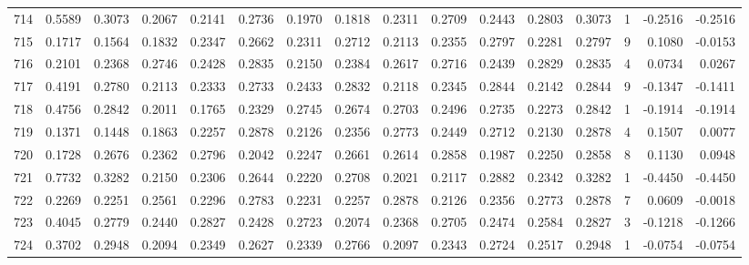 \begin{tabular}{lrrrrrrrrrrrrrrr}
714 &      0.5589 &  0.3073 &  0.2067 &  0.2141 &  0.2736 &  0.1970 &  0.1818 &  0.2311 &  0.2709 &  0.2443 &   0.2803 &     0.3073 &      1 &                   -0.2516 &                    -0.2516 \\
715 &      0.1717 &  0.1564 &  0.1832 &  0.2347 &  0.2662 &  0.2311 &  0.2712 &  0.2113 &  0.2355 &  0.2797 &   0.2281 &     0.2797 &      9 &                    0.1080 &                    -0.0153 \\
716 &      0.2101 &  0.2368 &  0.2746 &  0.2428 &  0.2835 &  0.2150 &  0.2384 &  0.2617 &  0.2716 &  0.2439 &   0.2829 &     0.2835 &      4 &                    0.0734 &                     0.0267 \\
717 &      0.4191 &  0.2780 &  0.2113 &  0.2333 &  0.2733 &  0.2433 &  0.2832 &  0.2118 &  0.2345 &  0.2844 &   0.2142 &     0.2844 &      9 &                   -0.1347 &                    -0.1411 \\
718 &      0.4756 &  0.2842 &  0.2011 &  0.1765 &  0.2329 &  0.2745 &  0.2674 &  0.2703 &  0.2496 &  0.2735 &   0.2273 &     0.2842 &      1 &                   -0.1914 &                    -0.1914 \\
719 &      0.1371 &  0.1448 &  0.1863 &  0.2257 &  0.2878 &  0.2126 &  0.2356 &  0.2773 &  0.2449 &  0.2712 &   0.2130 &     0.2878 &      4 &                    0.1507 &                     0.0077 \\
720 &      0.1728 &  0.2676 &  0.2362 &  0.2796 &  0.2042 &  0.2247 &  0.2661 &  0.2614 &  0.2858 &  0.1987 &   0.2250 &     0.2858 &      8 &                    0.1130 &                     0.0948 \\
721 &      0.7732 &  0.3282 &  0.2150 &  0.2306 &  0.2644 &  0.2220 &  0.2708 &  0.2021 &  0.2117 &  0.2882 &   0.2342 &     0.3282 &      1 &                   -0.4450 &                    -0.4450 \\
722 &      0.2269 &  0.2251 &  0.2561 &  0.2296 &  0.2783 &  0.2231 &  0.2257 &  0.2878 &  0.2126 &  0.2356 &   0.2773 &     0.2878 &      7 &                    0.0609 &                    -0.0018 \\
723 &      0.4045 &  0.2779 &  0.2440 &  0.2827 &  0.2428 &  0.2723 &  0.2074 &  0.2368 &  0.2705 &  0.2474 &   0.2584 &     0.2827 &      3 &                   -0.1218 &                    -0.1266 \\
724 &      0.3702 &  0.2948 &  0.2094 &  0.2349 &  0.2627 &  0.2339 &  0.2766 &  0.2097 &  0.2343 &  0.2724 &   0.2517 &     0.2948 &      1 &                   -0.0754 &                    -0.0754 \\

\end{tabular}
